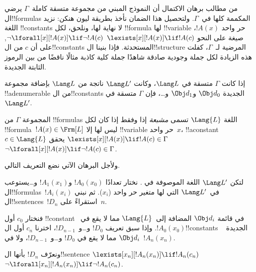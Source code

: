 \documentclass[../../../include/open-logic-section]{subfiles}
\begin{document}


\begin{explain}
من مطالب برهان الاكتمال أن النموذج المبني من مجموعة متسقة
كاملة~$\Gamma$ يرضي ال!!{formula}s المكممة كلها في~$\Gamma$.
ولتحصيل هذا الضمان نأخذ بطريقة ليون هنكن: نزيد اللغة
!!{constant}s لا نهاية لها، ونلحق، لكل !!{formula} لها
!!{variable} حر واحد $!A(x)$، صيغة على النحو
      {$\lexists[x][!A(x)] \lif !A(c)$}
      {$\lnot\lforall[x][!A(x)] \lif \lnot !A(c)$},
على أن $c$ من ال!!{constant}s المستحدثة. فإذا بنينا ال!!{structure}
المرضية لـ~$\Gamma$، كفلت هذه الزيادة لكل
{جملة وجودية صادقة شاهدًا}
{جملة كلية كاذبة مثالًا ناقضًا}
من بين الرموز الثابتة الجديدة.
\end{explain}

\begin{prop}
إذا كانت $\Gamma$ متسقة في $\Lang L$، وكانت $\Lang L'$ ناتجة من
$\Lang L$ بإضافة مجموعة !!a{denumerable} من ال!!{constant}s الجديدة
$\Obj d_0$ و$\Obj d_1$ و\dots، فإن $\Gamma$ متسقة في~$\Lang L'$.
\end{prop}

\begin{defn}
المجموعة $\Gamma$ من !!{formula}s اللغة $\Lang {L}$ تسمى
\emph{مشبعة} إذا وفقط إذا كان لكل !!{formula}~$!A(x) \in \Frm[L]$
ليس لها إلا !!{variable} حر واحد~$x$، !!a{constant}~$c \in \Lang{L}$ يحقق
      {$\lexists[x][!A(x)] \lif !A(c) \in \Gamma$}
      {$\lnot\lforall[x][!A(x)] \lif \lnot !A(c) \in \Gamma$}.
\end{defn}

ولأجل البرهان الآتي نضع التعريف التالي.

\begin{defn}
لتكن $\Lang L'$ اللغة الموصوفة في . نختار تعدادًا
$!A_0(x_0)$ و$!A_1(x_1)$ و\dots يستوعب ال!!{formula}s~$!A_i(x_i)$
في~$\Lang L'$ التي لها متغير حر واحد ($x_i$). ثم نبني
ال!!{sentence}s~$!D_n$ استقراءً على~$n$.

فنختار $c_0$ أول !!{constant} في قائمة $\Obj d_i$ المضافة
إلى~$\Lang{L}$ مما لا يقع في~$!A_0(x_0)$. وإذا سبق تعريف $!D_0$
و\dots و~$!D_{n-1}$، اخترنا $c_n$ أول ال!!{constant}s الجديدة
~$\Obj d_i$ مما لا يقع في $!D_0$ و\dots و~$!D_{n-1}$، ولا
في~$!A_n(x_n)$.

ونعرّف $!D_{n}$ بأنها ال!!{sentence} 
{$\lexists[x_{n}][!A_{n}(x_{n})] \lif
  !A_{n}(c_{n})$}{$\lnot\lforall[x_{n}][!A_{n}(x_{n})] \lif \lnot
  !A_{n}(c_{n})$}.
\end{defn}
\end{document}
